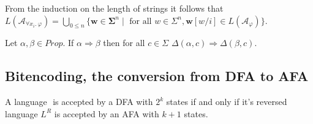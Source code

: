From the induction on the length of strings it follows that
\(L(\mathcal{A}_{\forall x_i .\ \varphi}) = \bigcup\limits_{0 \leq n}\{
\mathbf{w} \in \boldsymbol{\Sigma}^n \mid \text{ for all } w \in \Sigma^n ,
\mathbf{w}[w/i]\in L(\mathcal{A}_{\varphi}) \} \).

\begin{lemma}
Let \(\alpha, \beta \in \mathit{Prop} \). If \( \alpha \Rightarrow \beta \) then for all
\( c \in \Sigma \) \( \Delta(\alpha, c) \Rightarrow \Delta(\beta, c) \).
\end{lemma}

\subsection{Bitencoding, the conversion from DFA to AFA}
\begin{theorem}
A language \(\) is accepted by a DFA with \( 2^k \) states if and only if it's reversed
language \( L^R \) is accepted by an AFA with \( k + 1 \) states.
\end{theorem}
